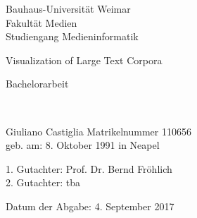 \captionsetup{subrefformat=bold}

\usetikzlibrary{arrows.meta, babel, decorations.pathreplacing, matrix}
\usepackage{tikz-uml}
\pgfplotsset{width=10cm,compat=1.9}


\hypersetup{hidelinks}


\pagestyle{empty}

\clearscrheadings\clearscrplain

\begin{flushleft}
\begin{normalsize}
Bauhaus-Universität Weimar\\
Fakultät Medien \\
Studiengang Medieninformatik
\vspace{3mm}
\end{normalsize}
\end{flushleft}

\begin{center}
\vspace{20mm}
\begin{LARGE}
Visualization of Large Text Corpora
\end{LARGE}
\vspace{20mm}
\begin{LARGE}
Bachelorarbeit
\end{LARGE}\\
\vspace{0.4cm}
\vspace{2 cm}

\vspace{1 cm}
\begin{flushleft}Giuliano Castiglia \hfill Matrikelnummer 110656\\
geb. am: 8. Oktober 1991 in Neapel
\end{flushleft}

\vspace{0.5 cm}

\begin{flushleft}
1. Gutachter: Prof. Dr. Bernd Fröhlich\\
2. Gutachter: tba\\
\end{flushleft}

\vspace{1.5cm}
\begin{flushleft}
Datum der Abgabe: 4. September 2017
\end{flushleft}
\end{center}
\clearpage
\pagestyle{useheadings} %
\renewcommand*\contentsname{Table of Contents}

